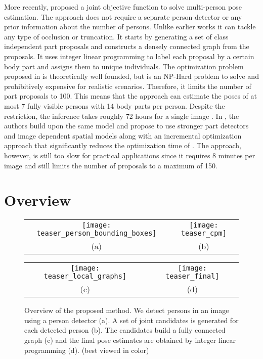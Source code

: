 \documentclass[runningheads]{llncs}
\begin{document}
More recently, \cite{pishchulin2015deepcut} proposed a joint objective function to solve multi-person pose estimation. The approach does not require a separate person detector or any prior information about the number of persons. Unlike earlier works it can tackle any type of occlusion or truncation. It starts by generating a set of class independent part proposals and constructs a densely connected graph from the proposals. It uses integer linear programming to label each proposal by a certain body part and assigns them to unique individuals. The optimization problem proposed in \cite{pishchulin2015deepcut} is theoretically well founded, but is an NP-Hard problem to solve and prohibitively expensive for realistic scenarios. Therefore, it limits the number of part proposals to 100. This means that the approach can estimate the poses of at most 7 fully visible persons with 14 body parts per person. Despite the restriction, the inference takes roughly 72 hours for a single image \cite{insafutdinov2016deepercut}. In \cite{insafutdinov2016deepercut}, the authors build upon the same model and propose to use stronger part detectors and image dependent spatial models along with an incremental optimization approach that significantly reduces the optimization time of \cite{pishchulin2015deepcut}. The approach, however, is still too slow for practical applications since it requires 8 minutes per image and still limits the number of proposals to a maximum of 150. 

\section{Overview}
\begin{figure*}[t!]
  \centering
  \begin{tabular}{c c}
    \texttt{[image: teaser\_person\_bounding\_boxes]} &
    \texttt{[image: teaser\_cpm]} \\
    (a) & (b)
  \end{tabular}

  \begin{tabular}{c c}
    \texttt{[image: teaser\_local\_graphs]} &
    \texttt{[image: teaser\_final]} \\
    (c) & (d)
  \end{tabular}
  \caption{Overview of the proposed method. We detect persons in an image using a person detector (a). A set of joint candidates is generated for each detected person (b). The candidates build a fully connected graph (c) and the final pose estimates are obtained by integer linear programming (d). (best viewed in color)}
  \label{fig:overview}
\end{figure*}
\end{document}
